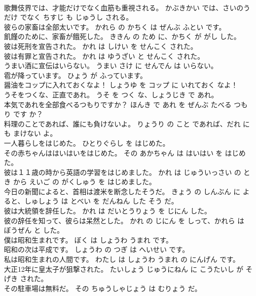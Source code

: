 \documentclass[8pt]{extreport}
\begin{document}
\begin{CJK}{UTF8}{min}
\\	歌舞伎界では、才能だけでなく血筋も重視される。	かぶきかい では、さいのう だけ でなく ちすじ も じゅうし される。	
\\	彼らの家畜は全部太いです。	かれら の かちく は ぜんぶ ふとい です。	
\\	飢饉のために、家畜が餓死した。	ききん の ため に、かちく が がし した。	
\\	彼は死刑を宣告された。	かれ は しけい を せんこく された。	
\\	彼は有罪と宣告された。	かれ は ゆうざい と せんこく された。	
\\	うまい酒に宣伝はいらない。	うまい さけ に せんでん は いらない。	
\\	雹が降っています。	ひょう が ふっています。	
\\	醤油をコップに入れておくなよ！	しょうゆ を コップ に いれておく なよ！	
\\	うそをつくな、正直であれ。	うそ を つく な、しょうじき で あれ。	
\\	本気であれを全部食べるつもりですか？	ほんき で あれ を ぜんぶ たべる つもり です か？	
\\	料理のことであれば、誰にも負けないよ。	りょうり の こと であれば、だれ にも まけない よ。	
\\	一人暮らしをはじめた。	ひとりぐらし を はじめた。	
\\	その赤ちゃんははいはいをはじめた。	その あかちゃん は はいはい を はじめた。	
\\	彼は１１歳の時から英語の学習をはじめました。	かれ は じゅういっさい の とき から えいご の がくしゅう を はじめました。	
\\	今日の新聞によると、首相は渡米を断念したそうだ。	きょう の しんぶん に よると、しゅしょう は とべい を だんねん した そう だ。	
\\	彼は大統領を辞任した。	かれ は だいとうりょう を じにん した。	
\\	彼の辞任を知って、彼らは呆然とした。	かれ の じにん を しって、かれら は ぼうぜん と した。	
\\	僕は昭和生まれです。	ぼく は しょうわ うまれ です。	
\\	昭和の次は平成です。	しょうわ の つぎ は へいせい です。	
\\	私は昭和生まれの人間です。	わたし は しょうわ うまれ の にんげん です。	
\\	大正12年に皇太子が狙撃された。	たいしょう じゅうにねん に こうたいし が そげき された。	
\\	その駐車場は無料だ。	その ちゅうしゃじょう は むりょう だ。	

\end{CJK}
\end{document}
